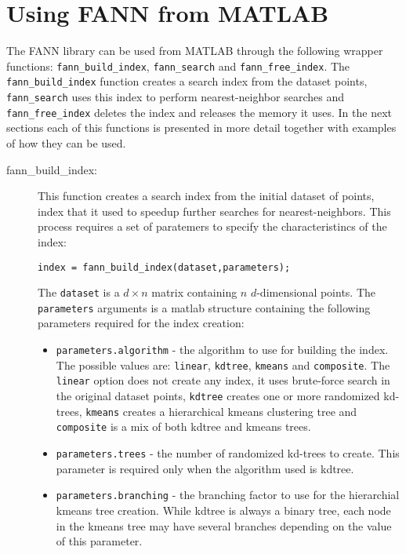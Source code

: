 \documentclass[letter,10pt]{article}
\begin{document}
\section{Using FANN from MATLAB}

The FANN library can be used from MATLAB through the following wrapper functions: \texttt{fann\_build\_index}, \texttt{fann\_search} and \texttt{fann\_free\_index}. The \texttt{fann\_build\_index} function creates a search index from the dataset points, \texttt{fann\_search} uses this index to perform nearest-neighbor searches and \texttt{fann\_free\_index} deletes the index and releases the memory it uses. In the next sections each of this functions is presented in more detail together  with examples of how they can be used.


\begin{description}
 \item[fann\_build\_index:] This function creates a search index from the initial dataset of points, index that it used to speedup further searches for nearest-neighbors. This process requires a set of paratemers to specify the characteristincs of the index:
\begin{Verbatim}
index = fann_build_index(dataset,parameters);
\end{Verbatim}

The \texttt{dataset} is a $d \times n$ matrix containing $n$ $d$-dimensional points. The \texttt{parameters} arguments is a matlab structure containing the following parameters required for the index creation:
\begin{itemize}
	\item \texttt{parameters.algorithm} - the algorithm to use for building the index. The possible values are: \texttt{linear}, \texttt{kdtree}, \texttt{kmeans} and \texttt{composite}. The \texttt{linear} option does not create any index, it uses brute-force search in the original dataset points, \texttt{kdtree} creates one or more randomized kd-trees, \texttt{kmeans} creates a hierarchical kmeans clustering tree and \texttt{composite} is a mix of both kdtree and kmeans trees.
	
	\item \texttt{parameters.trees} - the number of randomized kd-trees to create. This parameter is required only when the algorithm used is kdtree.
	
	\item \texttt{parameters.branching} - the branching factor to use for the hierarchial kmeans tree creation. While kdtree is always a binary tree, each node in the kmeans tree may have several branches depending on the value of this parameter.
	

\end{itemize}
\end{description}
\end{document}
